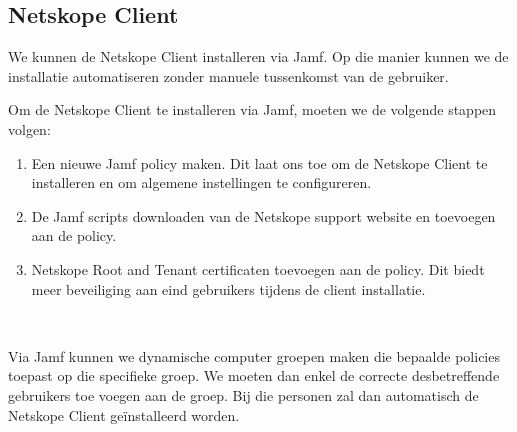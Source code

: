 \subsection{Netskope Client}
We kunnen de Netskope Client installeren via Jamf. Op die manier kunnen we de installatie automatiseren zonder manuele tussenkomst van de gebruiker.

Om de Netskope Client te installeren via Jamf, moeten we de volgende stappen volgen:

\begin{enumerate}
    \item Een nieuwe Jamf policy maken. Dit laat ons toe om de Netskope Client te installeren en om algemene instellingen te configureren.
    \item De Jamf scripts downloaden van de Netskope support website en toevoegen aan de policy.
    \item Netskope Root and Tenant certificaten toevoegen aan de policy. Dit biedt meer beveiliging aan eind gebruikers tijdens de client installatie.
\end{enumerate}
~\autocite{Netskope2025-9}

Via Jamf kunnen we dynamische computer groepen maken die bepaalde policies toepast op die specifieke groep. We moeten dan enkel de correcte desbetreffende gebruikers toe voegen aan de groep. Bij die personen zal dan automatisch de Netskope Client geïnstalleerd worden.


